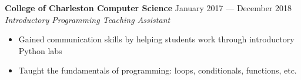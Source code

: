 \documentclass[letterpaper,14pt]{extarticle}
\begin{document}
  \textbf{College of Charleston Computer Science}
  \hspace*{\fill}
  \textcolor{color2}{January 2017 --- December 2018}
  \\ 
  \textcolor{color2}{
    \textit{
      \qquad{} Introductory Programming Teaching Assistant
    }
  }

  \begin{itemize}[itemsep=0pt, topsep=2pt]
    \item{Gained communication skills by helping students work through introductory Python labs}
    \item{Taught the fundamentals of programming: loops, conditionals, functions, etc.}
  \end{itemize}





\end{document}
